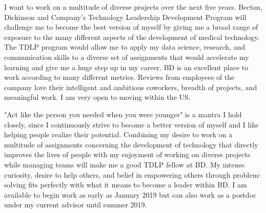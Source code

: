 \documentclass[11pt, letterpaper]{CV_latex_class}
\begin{document}
\begin{cvletter}

\hspace{1em} I want to work on a multitude of diverse projects over the next five years. Becton, Dickinson and Company's Technology Leadership Development Program will challenge me to become the best version of myself by giving me a broad range of exposure to the many different aspects of the development of medical technology. The TDLP program would allow me to apply my data science, research, and communication skills to a diverse set of assignments that would accelerate my learning and give me a huge step up in my career. BD is an excellent place to work according to many different metrics. Reviews from employees of the company love their intelligent and ambitious coworkers, breadth of projects, and meaningful work. I am very open to moving within the US.



\hspace{1em} "Act like the person you needed when you were younger" is a mantra I hold closely, since I continuously strive to become a better version of myself and I like helping people realize their potential. Combining my desire to work on a multitude of assignments concerning the development of technology that directly improves the lives of people with my enjoyment of working on diverse projects while managing teams will make me a good TDLP fellow at BD. My intense curiosity, desire to help others, and belief in empowering others through problem-solving fits perfectly with what it means to become a leader within BD. I am available to begin work as early as January 2019 but can also work as a postdoc under my current advisor until summer 2019.

\end{cvletter}


\makeletterclosing

\end{document}

